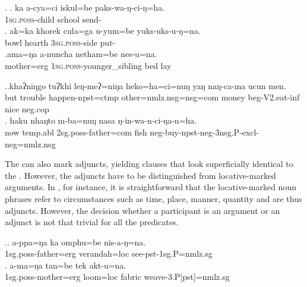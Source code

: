 \ex. \ag. ka a-cya=ci iskul=be paks-wa-ŋ-ci-ŋ=ha.\\
		 \textsc{1sg.poss}-child school send-\\
		\bg. ak=ka khorek cula=ga u-yum=be yuks-uks-u-ŋ=na.\\
	 bowl hearth \textsc{3sg.poss}-side put-\\
\bg.ama=ŋa a-nuncha netham=be nes-u=na.\\
mother{\sc =erg} \textsc{1sg.poss}-younger\_sibling  bed lay\\
	
 
\ex.\ag.khaʔniŋgo tuʔkhi leŋ-meʔ=niŋa  heko=ha=ci=nuŋ  yaŋ  naŋ-ca-ma ucun men.\\
but        trouble happen{\sc [3sg]-npst=ctmp} other{\sc=nmlz.nsg=nsg=com}  money beg{\sc-V2.eat-inf} nice {\sc neg.cop}\\
 
		\bg. haku nhaŋto    m-ba=nuŋ                nasa ŋ-in-wa-n-ci-ŋa-n=ha.\\
		now {\sc temp.abl} {\sc 2sg.poss-}father{\sc =com} fish {\sc neg-}buy{\sc -npst-neg-3nsg.P-excl-neg=nmlz.nsg}\\
		 

The  can also mark adjuncts, yielding clauses that look superficially identical to the . However, the adjuncts have to be distinguished from locative-marked arguments. In \Next, for instance, it is straightforward that the locative-marked noun phrases refer to  circumstances  such as time, place, manner, quantity \citep[108]{Tesniere1959Elements} and are thus adjuncts. However, the decision whether a participant is an argument or an adjunct is not that trivial for all the predicates.

\ex.\ag. a-ppa=ŋa ka omphu=be nis-a-ŋ=na.\\
{\sc 1sg.poss-}father{\sc =erg}  verandah{\sc =loc} see{\sc -pst-1sg.P=nmlz.sg}\\
\bg. a-ma=ŋa tan=be tek akt-u=na.\\
{\sc 1sg.poss-}mother{\sc =erg} loom{\sc =loc} fabric weave{\sc -3.P[pst]=nmlz.sg}\\
 
